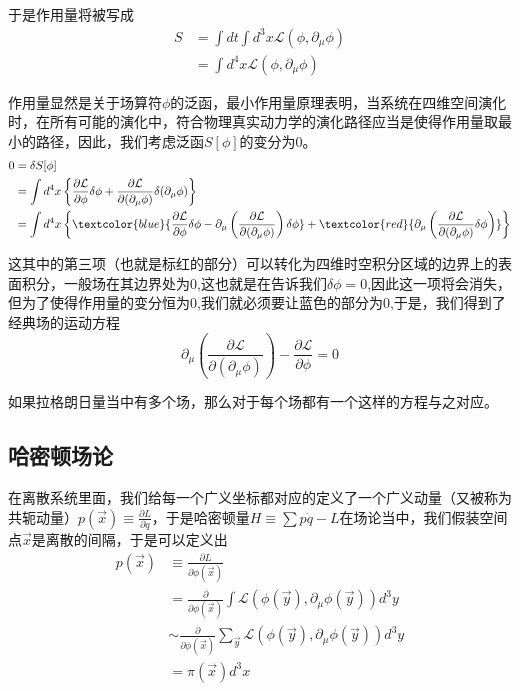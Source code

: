 \documentclass{article}
\begin{document}
于是作用量将被写成
\begin{align*}
    S&=\int dt\int d^3x\mathcal{L}(\phi,\partial_\mu\phi)\\
    &=\int d^4x \mathcal{L}(\phi,\partial_\mu\phi)
\end{align*}

作用量显然是关于场算符$\phi$的泛函，最小作用量原理表明，当系统在四维空间演化时，在所有可能的演化中，符合物理真实动力学的演化路径应当是使得作用量取最小的路径，因此，我们考虑泛函$S[\phi]$的变分为$0$。
\begin{align*}
    0&=\delta S[\phi]\\
    &=\int d^4x \left\{\frac{\partial\mathcal{L}}{\partial \phi}\delta\phi+\frac{\partial \mathcal{L}}{\partial(\partial_\mu \phi)}\delta(\partial_\mu \phi)\right\}\\
    &=\int d^4x \left\{\textcolor{blue}{\frac{\partial\mathcal{L}}{\partial \phi}\delta \phi-\partial_\mu\left(\frac{\partial \mathcal{L}}{\partial(\partial_\mu\phi)}\right)\delta \phi}+\textcolor{red}{\partial_{\mu}\left(\frac{\partial \mathcal{L}}{\partial(\partial_\mu\phi)}\delta\phi\right)}\right\}
\end{align*}

这其中的第三项（也就是标红的部分）可以转化为四维时空积分区域的边界上的表面积分，一般场在其边界处为$0$,这也就是在告诉我们$\delta \phi=0$,因此这一项将会消失，但为了使得作用量的变分恒为$0$,我们就必须要让蓝色的部分为$0$,于是，我们得到了经典场的运动方程
\begin{equation*}
    \partial_\mu\left(\frac{\partial \mathcal{L}}{\partial(\partial_\mu\phi)}\right)-\frac{\partial\mathcal{L}}{\partial \phi}=0
\end{equation*}

如果拉格朗日量当中有多个场，那么对于每个场都有一个这样的方程与之对应。





\subsection{哈密顿场论}
在离散系统里面，我们给每一个广义坐标都对应的定义了一个广义动量（又被称为共轭动量）$p(\vec{x})\equiv\frac{\partial L}{\partial \dot{q}}$，于是哈密顿量$H\equiv\sum p\dot{q}-L$在场论当中，我们假装空间点$\vec{x}$是离散的间隔，于是可以定义出
\begin{align*}
    p(\vec{x})&\equiv\frac{\partial L}{\partial \phi(\vec{x})}\\
    &=\frac{\partial}{\partial \phi(\vec{x})}\int\mathcal{L}(\phi(\vec{y}),\partial_\mu\phi(\vec{y}))d^3y\\
    &\sim \frac{\partial}{\partial \phi(\vec{x})}\sum_{\vec{y}}\mathcal{L}(\phi(\vec{y}),\partial_\mu\phi(\vec{y}))d^3y\\
    &=\pi(\vec{x})d^3x
\end{align*}
\end{document}
